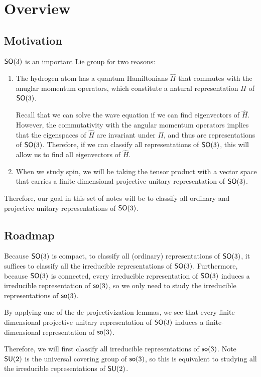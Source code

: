 \section{Overview}
\subsection{Motivation}
$\operatorname{\textsf{SO}}(3)$ is an important Lie group for two reasons:
\begin{enumerate}
    \item The hydrogen atom has a quantum Hamiltonians $\hat{H}$ that commutes with the anuglar momentum operators, which constitute a natural representation $\Pi$ of $\operatorname{\textsf{SO}}(3)$.

    Recall that we can solve the wave equation if we can find eigenvectors of $\hat{H}$. However, the commutativity with the angular momentum operators implies that the eigenspaces of $\hat{H}$ are invariant under $\Pi$, and thus are representations of $\operatorname{\textsf{SO}}(3)$. Therefore, if we can classify all representations of $\operatorname{\textsf{SO}}(3)$, this will allow us to find all eigenvectors of $\hat{H}$.

    \item  When we study spin, we will be taking the tensor product with a vector space that carries a finite dimensional projective unitary representation of $\operatorname{\textsf{SO}}(3)$.
\end{enumerate}
Therefore, our goal in this set of notes will be to classify all ordinary and projective unitary representations of $\operatorname{\textsf{SO}}(3)$.

\subsection{Roadmap}
Because $\operatorname{\textsf{SO}}(3)$ is compact, to classify all (ordinary) representations of $\operatorname{\textsf{SO}}(3)$, it suffices to classify all the irreducible representations of $\operatorname{\textsf{SO}}(3)$. Furthermore, because $\operatorname{\textsf{SO}}(3)$ is connected, every irreducible representation of $\operatorname{\textsf{SO}}(3)$ induces a irreducible representation of $\operatorname{\textsf{so}}(3)$, so we only need to study the irreducible representations of $\operatorname{\textsf{so}}(3)$.

By applying one of the de-projectivization lemmas, we see that every finite dimensional projective unitary representation of $\operatorname{\textsf{SO}}(3)$ induces a finite-dimensional representation of $\operatorname{\textsf{so}}(3)$.

Therefore, we will first classify all irreducible representations of $\operatorname{\textsf{so}}(3)$. Note $\operatorname{\textsf{SU}}(2)$ is the universal covering group of $\operatorname{\textsf{so}}(3)$, so this is equivalent to studying all the irreducible representations of $\operatorname{\textsf{SU}}(2)$.
